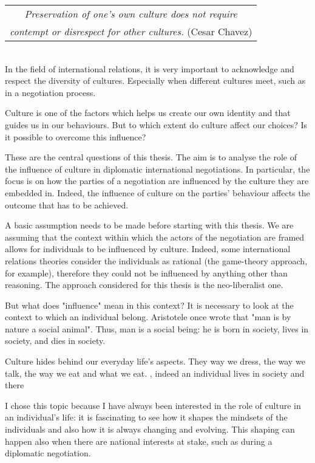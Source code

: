 ﻿\documentclass[../main.tex]{subfiles}
\begin{document}
  \begin{tabular}{c}
 \textit{Preservation of one's own culture does not require}\\
 \textit{contempt or disrespect for other cultures.} (Cesar Chavez)\\
  \end{tabular}\\


In the field of international relations, it is very important to acknowledge and respect the diversity of cultures. Especially when different cultures meet, such as in a negotiation process.

Culture is one of the factors which helps us create our own identity and that guides us in our behaviours. But to which extent do culture affect our choices? Is it possible to overcome this influence?

These are the central questions of this thesis. The aim is to analyse the role of the influence of culture in diplomatic international negotiations. In particular, the focus is on how the parties of a negotiation are influenced by the culture they are embedded in. Indeed, the influence of culture on the parties' behaviour affects the outcome that has to be achieved.

A basic assumption needs to be made before starting with this thesis. We are assuming that the context within which the actors of the negotiation are framed allows for individuals to be influenced by culture.
Indeed, some international relations theories consider the individuals as rational (the game-theory approach, for example), therefore they could not be influenced by anything other than reasoning. The approach considered for this thesis is the neo-liberalist one.

But what does "influence" mean in this context? It is necessary to look at the context to which an individual belong. Aristotele once wrote that "man is by nature a social animal". Thus, man is a social being: he is born in society, lives in society, and dies in society. 

Culture hides behind our everyday life's aspects. They way we dress, the way we talk, the way we eat and what we eat. , indeed an individual lives in society and there


I chose this topic because I have always been interested in the role of culture in an individual's life: it is fascinating to see how it shapes the mindsets of the individuals and also how it is always changing and evolving. This shaping can happen also when there are national interests at stake, such as during a diplomatic negotiation.
\end{document}
